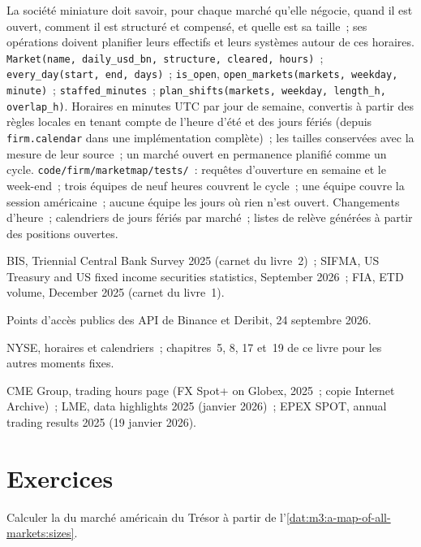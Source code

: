 \begin{build}
 La société miniature doit savoir, pour chaque marché qu'elle négocie, quand il est ouvert, comment il est structuré et compensé, et quelle est sa taille~; ses opérations
doivent planifier leurs effectifs et leurs systèmes autour de ces horaires.
 \texttt{Market(name, daily\_usd\_bn, structure, cleared, hours)}~; \texttt{every\_day(start, end, days)}~; \texttt{is\_open},
\texttt{open\_markets(markets, weekday, minute)}~; \texttt{staffed\_minutes}~; \texttt{plan\_shifts(markets, weekday, length\_h, overlap\_h)}.
 Horaires en minutes UTC par jour de semaine, convertis à partir des règles locales en tenant compte de l'heure d'été et des jours fériés (depuis \texttt{firm.calendar} dans une
implémentation complète)~; les tailles conservées avec la mesure de leur source~; un marché ouvert en permanence planifié comme un cycle.
 \texttt{code/firm/marketmap/tests/}~: requêtes d'ouverture en semaine et le week-end~; trois équipes de neuf heures couvrent le cycle~; une équipe couvre la
session américaine~; aucune équipe les jours où rien n'est ouvert.
 Changements d'heure~; calendriers de jours fériés par marché~; listes de relève générées à partir des positions ouvertes.
\end{build}

\begin{omsources}
\item BIS, Triennial Central Bank Survey 2025 (carnet du livre~2)~; SIFMA, US Treasury and US fixed income securities statistics, September 2026~;
FIA, ETD volume, December 2025 (carnet du livre~1).
\item Points d'accès publics des API de Binance et Deribit, 24 septembre 2026.
\item NYSE, horaires et calendriers~; chapitres~5, 8, 17 et~19 de ce livre pour les autres moments fixes.
\item CME Group, trading hours page (FX Spot+ on Globex, 2025~; copie Internet Archive)~; LME, data highlights 2025 (janvier 2026)~; EPEX SPOT, annual
trading results 2025 (19 janvier 2026).
\end{omsources}

\section{Exercices}

\begin{exercise}[$\star$]\label{exo:m3:a-map-of-all-markets:1}
Calculer la  du marché américain du Trésor à partir de l'\cref{dat:m3:a-map-of-all-markets:sizes}.
\end{exercise}

